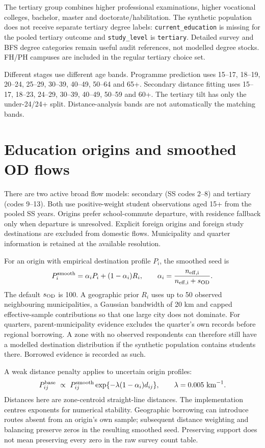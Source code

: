 \documentclass[11pt,a4paper]{article}
\newcommand{\code}[1]{\nolinkurl{#1}}
\begin{document}
The tertiary group combines higher professional examinations, higher vocational
colleges, bachelor, master and doctorate/habilitation. The synthetic population
does not receive separate tertiary degree labels: \code{current_education}
is missing for the pooled tertiary outcome and \code{study_level} is
\code{tertiary}. Detailed survey and BFS degree categories remain useful audit
references, not modelled degree stocks. FH/PH campuses are included in the
regular tertiary choice set.

Different stages use different age bands. Programme prediction uses
15--17, 18--19, 20--24, 25--29, 30--39, 40--49, 50--64 and 65+.
Secondary distance fitting uses 15--17, 18--23, 24--29, 30--39, 40--49,
50--59 and 60+. The tertiary tilt has only the under-24/24+ split.
Distance-analysis bands are not automatically the matching bands.

\section{Education origins and smoothed OD flows}

There are two active broad flow models: secondary (SS codes 2--8) and tertiary
(codes 9--13). Both use positive-weight student observations aged 15+ from
the pooled SS years. Origins prefer school-commute departure, with residence
fallback only when departure is unresolved. Explicit foreign origins and
foreign study destinations are excluded from domestic flows. Municipality
and quarter information is retained at the available resolution.

For an origin with empirical destination profile \(P_i\), the smoothed seed is
\[
 P_i^{\rm smooth}=\alpha_i P_i+(1-\alpha_i)R_i,
 \qquad \alpha_i=\frac{n_{\rm eff,i}}{n_{\rm eff,i}+s_{\rm OD}}.
\]
The default \(s_{\rm OD}\) is 100. A geographic prior \(R_i\) uses up to
50 observed neighbouring municipalities, a Gaussian bandwidth of 20 km and
capped effective-sample contributions so that one large city does not dominate.
For quarters, parent-municipality evidence excludes the quarter's own records
before regional borrowing. A zone with no observed respondents can therefore
still have a modelled destination distribution if the synthetic population
contains students there. Borrowed evidence is recorded as such.

A weak distance penalty applies to uncertain origin profiles:
\[
 P_{ij}^{\rm base}\ \propto\ P_{ij}^{\rm smooth}
 \exp\{-\lambda(1-\alpha_i)d_{ij}\},
 \qquad \lambda=0.005\ {\rm km}^{-1}.
\]
Distances here are zone-centroid straight-line distances. The implementation
centres exponents for numerical stability. Geographic borrowing can introduce
routes absent from an origin's own sample; subsequent distance weighting and
balancing preserve zeros in the resulting smoothed seed. Preserving support
does not mean preserving every zero in the raw survey count table.
\end{document}
